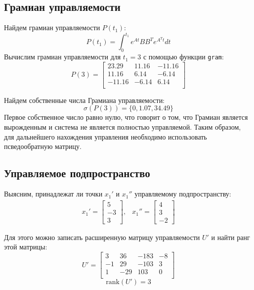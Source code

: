 \subsection{Грамиан управляемости}
Найдем грамиан управляемости $P(t_1)$:
\begin{equation}
    P(t_1) = \int_{0}^{t_1} e^{At}BB^Te^{A^Tt}dt
\end{equation}
Вычислим грамиан управляемости для $t_1 = 3$ с помощью функции \texttt{gram}: 
\begin{equation}
    P(3) = \begin{bmatrix}
        23.29 & 11.16 & -11.16 \\ 
        11.16 & 6.14 & -6.14 \\ 
        -11.16 & -6.14 & 6.14 \\ 
    \end{bmatrix}
\end{equation}

Найдем собственные числа Грамиана управляемости:
\begin{equation}
   \sigma(P(3)) = \{0, 1.07, 34.49 \}
\end{equation}
Первое собственное число равно нулю, что говорит о том, что Грамиан является вырожденным и система не является полностью
управляемой. Таким образом, для дальнейшего нахождения управления необходимо использовать псведообратную матрицу. 

\subsection{Управляемое подпространство}
Выясним, принадлежат ли точки $x_1'$ и $x_1''$ управляемому подпространству:
\begin{equation}
    \begin{array}{cc}
        x_1' = \begin{bmatrix}
            5 \\
            -3 \\
            3
        \end{bmatrix}, &
        x_1'' = \begin{bmatrix}
            4 \\
            3 \\
            -2
        \end{bmatrix}
    \end{array}
\end{equation}

Для этого можно записать расширенную матрицу управляемости $U'$ и найти ранг этой матрицы:
\begin{equation}
    U' = \begin{bmatrix}
        3 & 36 & -183 & -8 \\ 
        -1 & 29 & -103 & 3 \\ 
        1 & -29 & 103 & 0 \\ 
    \end{bmatrix}
\end{equation}
\begin{equation}
    \text{rank}(U') = 3
\end{equation}

